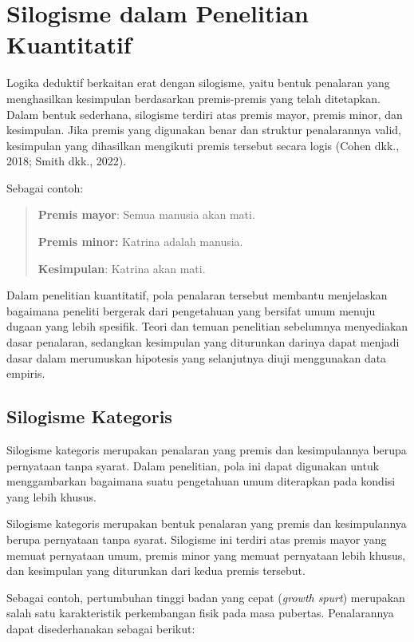 \documentclass[
  indonesian,
  letterpaper,
  DIV=11,
  numbers=noendperiod]{scrreprt}
\begin{document}
\section{Silogisme dalam Penelitian
Kuantitatif}\label{silogisme-dalam-penelitian-kuantitatif}

Logika deduktif berkaitan erat dengan silogisme, yaitu bentuk penalaran
yang menghasilkan kesimpulan berdasarkan premis-premis yang telah
ditetapkan. Dalam bentuk sederhana, silogisme terdiri atas premis mayor,
premis minor, dan kesimpulan. Jika premis yang digunakan benar dan
struktur penalarannya valid, kesimpulan yang dihasilkan mengikuti premis
tersebut secara logis (Cohen dkk., 2018; Smith dkk., 2022).

Sebagai contoh:

\begin{quote}
\textbf{Premis mayor}: Semua manusia akan mati.

\textbf{Premis minor:} Katrina adalah manusia.

\textbf{Kesimpulan}: Katrina akan mati.
\end{quote}

Dalam penelitian kuantitatif, pola penalaran tersebut membantu
menjelaskan bagaimana peneliti bergerak dari pengetahuan yang bersifat
umum menuju dugaan yang lebih spesifik. Teori dan temuan penelitian
sebelumnya menyediakan dasar penalaran, sedangkan kesimpulan yang
diturunkan darinya dapat menjadi dasar dalam merumuskan hipotesis yang
selanjutnya diuji menggunakan data empiris.

\subsection{Silogisme Kategoris}\label{silogisme-kategoris}

Silogisme kategoris merupakan penalaran yang premis dan kesimpulannya
berupa pernyataan tanpa syarat. Dalam penelitian, pola ini dapat
digunakan untuk menggambarkan bagaimana suatu pengetahuan umum
diterapkan pada kondisi yang lebih khusus.

Silogisme kategoris merupakan bentuk penalaran yang premis dan
kesimpulannya berupa pernyataan tanpa syarat. Silogisme ini terdiri atas
premis mayor yang memuat pernyataan umum, premis minor yang memuat
pernyataan lebih khusus, dan kesimpulan yang diturunkan dari kedua
premis tersebut.

Sebagai contoh, pertumbuhan tinggi badan yang cepat (\emph{growth
spurt}) merupakan salah satu karakteristik perkembangan fisik pada masa
pubertas. Penalarannya dapat disederhanakan sebagai berikut:
\end{document}
